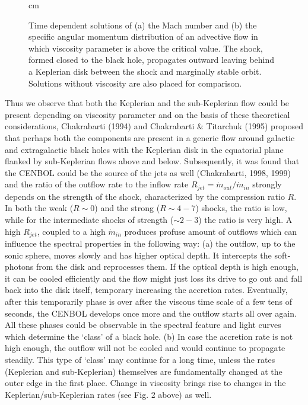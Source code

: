 \documentclass[referee]{cjaa}           %
\begin{document}
\begin{figure}
   \begin{center}
{\vskip 0.0cm
   \mbox{\textwidth{}\textwidth{}}
 cm
\hskip -1.0cm
\mbox{\textwidth{}\textwidth{}}
}
\vskip 0.0cm
   \caption{Time dependent solutions of (a) the Mach number and (b) the specific angular momentum distribution 
of an advective flow in which viscosity parameter is above the critical value. The shock, formed closed to the
black hole, propagates outward leaving behind a Keplerian disk between the shock and marginally stable
orbit. Solutions without viscosity are also placed for comparison.}
   \end{center}
\end{figure}

Thus we observe that both the Keplerian and the sub-Keplerian flow could be present depending on viscosity parameter
and on the basis of these theoretical considerations, Chakrabarti (1994) and Chakrabarti \& Titarchuk (1995) 
proposed that perhaps both the components are present in a generic flow around galactic and extragalactic black
holes with the Keplerian disk in the equatorial plane flanked by sub-Keplerian flows above and below. 
Subsequently, it was found that the CENBOL could be the source of the jets as well (Chakrabarti, 
1998, 1999) and the ratio of the outflow rate to the inflow rate $R_{jet}={\dot m}_{out}/{\dot m}_{in}$ strongly 
depends on the strength of the shock, characterized by the compression ratio $R$. In both the weak 
($R\sim 0$) and the strong ($R\sim 4-7$) shocks, the ratio is low, while for the intermediate 
shocks of strength ($\sim 2-3$) the ratio is very high. A high $R_{jet}$, coupled to a high ${\dot m}_{in}$ 
produces profuse amount of outflows which can influence the spectral properties in the following way:
(a) the outflow, up to the sonic sphere, moves slowly and has higher optical depth. It intercepts the 
soft-photons from the disk and reprocesses them. If the optical depth is high enough, it can be cooled efficiently
and the flow might just loss its drive to go out and fall back into the disk itself, temporary increasing the 
accretion rates. Eventually, after this temporarily phase is over after the viscous time scale of a few 
tens of seconds, the CENBOL develops once more and the outflow starts all over again.
All these phases could be observable in the spectral feature and light curves which
determine the `class' of a black hole. (b) In case the accretion rate is not high enough, the outflow
will not be cooled and would continue to propagate steadily. This type of `class' may continue for a
long time, unless the rates (Keplerian and sub-Keplerian) themselves are fundamentally changed at the outer edge
in the first place. Change in viscosity brings rise to changes in the Keplerian/sub-Keplerian
rates (see Fig. 2 above) as well. 
\end{document}
